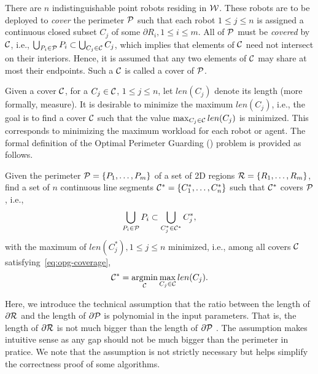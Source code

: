 There are $n$ indistinguishable point robots residing in $\W$.
These robots are to be deployed to {\em cover} the perimeter $\P$ such 
that each robot $1 \le j \le n$ is assigned a continuous closed subset 
$C_j$ of some $\partial R_i, 1 \le i \le m$. All of $\P$ must be 
{\em covered} by $\C$, i.e., 
%
$\bigcup_{P_i \in \P} P_i  \subset \bigcup_{C_j \in \C} C_j$,
%
which implies that elements of $\C$ need not intersect on their
interiors. Hence, it is assumed that any two elements of $\C$ may share 
at most their endpoints. Such a $\C$ is called a cover of $\P$. 

Given a cover $\C$, for a $C_j \in \C$, $1 \le j \le n$, let $len(C_j)$ 
denote its length (more formally, measure). It is desirable to minimize 
the maximum $len(C_j)$, i.e., the goal is to find a cover $\C$ such that 
the value 
%
$\max_{C_j \in \C} len(C_j)$
%
is minimized. This corresponds to minimizing the maximum workload for 
each robot or agent. The formal definition of the Optimal Perimeter 
Guarding (\opg) problem is provided as follows. 

\begin{problem} Given the perimeter 
$\P = \{P_1, \ldots, P_m\}$ of a set of 2D regions $\R =\{R_1, \ldots, 
R_m\}$, find a set of $n$ continuous line segments $\C^* = \{C_1^*, 
\ldots, C_n^*\}$ such that $\C^*$ covers $\P$, i.e., 
\begin{align}\label{eq:opg-coverage}
\bigcup_{P_i \in \P} P_i  \subset \bigcup_{C_j^* \in \C^*} C_j^*,
\end{align}
with the maximum of $len(C_j^*), 1 \le j \le n$ minimized, i.e., among all 
covers $\C$ satisfying~\eqref{eq:opg-coverage}, 
\begin{align}\label{eq:opg-objective}
\C^* = \underset{\C}{\mathrm{argmin}} \max_{C_j \in \C} len(C_j).
\end{align}
\end{problem}

Here, we introduce the technical assumption that the ratio between 
the length of $\partial \R$ and the length of $\partial \P$ is polynomial
in the input parameters. That is, the length of $\partial \R$ is not much 
bigger than the length of $\partial \P$ . 
The assumption makes intuitive sense as any 
gap should not be much bigger than the perimeter in pratice. We note 
that the assumption is not strictly necessary but helps simplify the 
correctness proof of some algorithms. 

